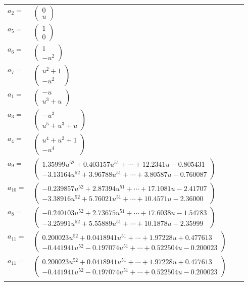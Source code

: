 \documentclass[1p]{elsarticle_modified}
\theoremstyle{definition}
\begin{document}
\begin{tabular}{m{7pt} m{180pt} m{7pt} m{180pt} }
\flushright $a_{2}=$&$\begin{pmatrix}0\\u\end{pmatrix}$ \\
\flushright $a_{5}=$&$\begin{pmatrix}1\\0\end{pmatrix}$ \\
\flushright $a_{6}=$&$\begin{pmatrix}1\\- u^2\end{pmatrix}$ \\
\flushright $a_{7}=$&$\begin{pmatrix}u^2+1\\- u^2\end{pmatrix}$ \\
\flushright $a_{1}=$&$\begin{pmatrix}- u\\u^3+u\end{pmatrix}$ \\
\flushright $a_{3}=$&$\begin{pmatrix}- u^3\\u^5+u^3+u\end{pmatrix}$ \\
\flushright $a_{4}=$&$\begin{pmatrix}u^4+u^2+1\\- u^4\end{pmatrix}$ \\
\flushright $a_{9}=$&$\begin{pmatrix}1.35999 u^{52}+0.403157 u^{51}+\cdots+12.2341 u-0.805431\\-3.13164 u^{52}+3.96788 u^{51}+\cdots+3.80587 u-0.760087\end{pmatrix}$ \\
\flushright $a_{10}=$&$\begin{pmatrix}-0.239857 u^{52}+2.87394 u^{51}+\cdots+17.1081 u-2.41707\\-3.38916 u^{52}+5.76021 u^{51}+\cdots+10.4571 u-2.36000\end{pmatrix}$ \\
\flushright $a_{8}=$&$\begin{pmatrix}-0.240103 u^{52}+2.73675 u^{51}+\cdots+17.6038 u-1.54783\\-3.25991 u^{52}+5.55889 u^{51}+\cdots+10.1878 u-2.35999\end{pmatrix}$ \\
\flushright $a_{11}=$&$\begin{pmatrix}0.200023 u^{52}+0.0418941 u^{51}+\cdots+1.97228 u+0.477613\\-0.441941 u^{52}-0.197074 u^{51}+\cdots+0.522504 u-0.200023\end{pmatrix}$\\ \flushright $a_{11}=$&$\begin{pmatrix}0.200023 u^{52}+0.0418941 u^{51}+\cdots+1.97228 u+0.477613\\-0.441941 u^{52}-0.197074 u^{51}+\cdots+0.522504 u-0.200023\end{pmatrix}$\\&\end{tabular}
\end{document}
